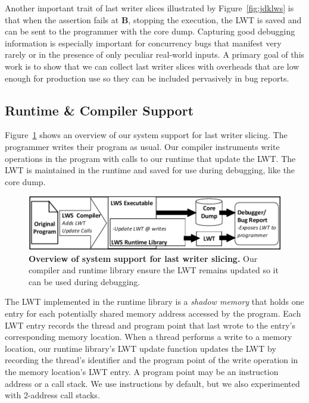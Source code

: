 \documentclass[preprint,9pt]{sigplanconf}
\newcommand{\lwt}{LWT\xspace}
\begin{document}
Another important trait of last writer slices illustrated by
Figure~\ref{fig:jdklws} is that when the assertion fails at {\bf B}, stopping
the execution, the \lwt is saved and can be sent to the programmer with the
core dump.  Capturing good debugging information is especially important for
concurrency bugs that manifest very rarely or in the presence of only peculiar
real-world inputs.  A primary goal of this work is to show that we can collect
last writer slices with overheads that are low enough for production use so
they can be included pervasively in bug reports.


\subsection{Runtime \& Compiler Support}

Figure~\ref{fig:lwsoverview} shows an overview of our system support for last
writer slicing.  The programmer writes their program as usual. Our compiler
instruments write operations in the program with calls to our runtime that
update the \lwt.  The \lwt is maintained in the runtime and saved for use
during debugging, like the core dump. 

\begin{figure}[h]
\centering
\includegraphics[width=.9\columnwidth]{figs/LWS_Overview.pdf}
\caption{\label{fig:lwsoverview}{\bf Overview of system support for last writer slicing.} Our compiler and runtime library ensure the \lwt remains updated so it can be used during debugging.}
\end{figure}

The \lwt implemented in the runtime library is a {\em shadow memory} that holds
one entry for each potentially shared memory address accessed by the program.
Each \lwt entry records the thread and program point that last wrote to the
entry's corresponding memory location.  When a thread performs a write to a
memory location, our runtime library's \lwt update function updates the \lwt by
recording the thread's identifier and the program point of the write operation
in the memory location's \lwt entry.  A program point may be an instruction
address or a call stack.  We use instructions by default, but we also experimented
with 2-address call stacks.   
\end{document}

